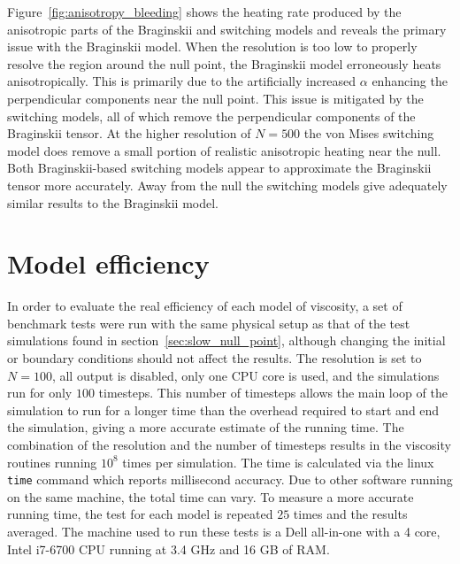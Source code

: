 Figure~\ref{fig:anisotropy_bleeding} shows the heating rate produced by the anisotropic parts of the Braginskii and switching models and reveals the primary issue with the Braginskii model. When the resolution is too low to properly resolve the region around the null point, the Braginskii model erroneously heats anisotropically. This is primarily due to the artificially increased $\alpha$ enhancing the perpendicular components near the null point. This issue is mitigated by the switching models, all of which remove the perpendicular components of the Braginskii tensor. At the higher resolution of $N=500$ the von Mises switching model does remove a small portion of realistic anisotropic heating near the null. Both Braginskii-based switching models appear to approximate the Braginskii tensor more accurately. Away from the null the switching models give adequately similar results to the Braginskii model.

\section{Model efficiency}

In order to evaluate the real efficiency of each model of viscosity, a set of benchmark tests were run with the same physical setup as that of the test simulations found in section~\ref{sec:slow_null_point}, although changing the initial or boundary conditions should not affect the results. The resolution is set to $N=100$, all output is disabled, only one CPU core is used, and the simulations run for only $100$ timesteps. This number of timesteps allows the main loop of the simulation to run for a longer time than the overhead required to start and end the simulation, giving a more accurate estimate of the running time. The combination of the resolution and the number of timesteps results in the viscosity routines running $10^{8}$ times per simulation. The time is calculated via the linux \verb|time| command which reports millisecond accuracy. Due to other software running on the same machine, the total time can vary. To measure a more accurate running time, the test for each model is repeated $25$ times and the results averaged. The machine used to run these tests is a Dell all-in-one with a 4 core, Intel i7-6700 CPU running at 3.4 GHz and 16 GB of RAM. 



